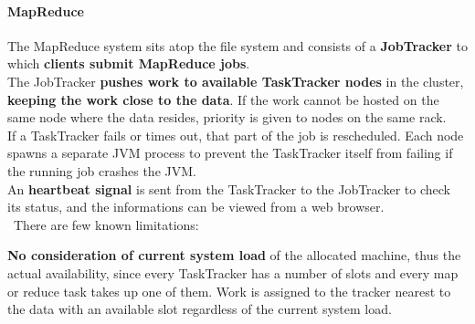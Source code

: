 \documentclass[10pt]{report}
\begin{document}
\paragraph{MapReduce} The MapReduce system sits atop the file system and consists of a \textbf{JobTracker} to which \textbf{clients submit MapReduce jobs}.\\
The JobTracker \textbf{pushes work to available TaskTracker nodes} in the cluster, \textbf{keeping the work close to the data}. If the work cannot be hosted on the same node where the data resides, priority is given to nodes on the same rack.\\
If a TaskTracker fails or times out, that part of the job is rescheduled. Each node spawns a separate JVM process to prevent the TaskTracker itself from failing if the running job crashes the JVM.\\
An \textbf{heartbeat signal} is sent from the TaskTracker to the JobTracker to check its status, and the informations can be viewed from a web browser.\\\
There are few known limitations:
\begin{list}{}{}
	\item \textbf{No consideration of current system load} of the allocated machine, thus the actual availability, since every TaskTracker has a number of slots and every map or reduce task takes up one of them. Work is assigned to the tracker nearest to the data with an available slot regardless of the current system load.
\end{list}
\end{document}
